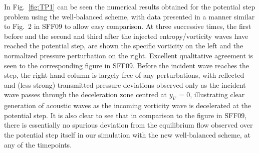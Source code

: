 In Fig.~\ref{fig:TP1} can be seen the numerical results obtained for the potential step problem using the well-balanced scheme, with data presented in a manner similar to Fig.~2 in SFF09 to allow easy comparison. At three successive times, the first before and the second and third after the injected entropy/vorticity waves have reached the potential step, are shown the specific vorticity on the left and the normalized pressure perturbation on the right. Excellent qualitative agreement is seen to the corresponding figure in SFF09. Before the incident wave reaches the step, the right hand column is largely free of any perturbations, with reflected and (less strong) transmitted pressure deviations observed only as the incident wave passes through the deceleration zone centred at $y_\nabla=0$, illustrating clear generation of acoustic waves as the incoming vorticity wave is decelerated at the potential step. It is also clear to see that in comparison to the figure in SFF09, there is essentially no spurious deviation from the equilibrium flow observed over the potential step itself in our simulation with the new well-balanced scheme, at any of the timepoints.

